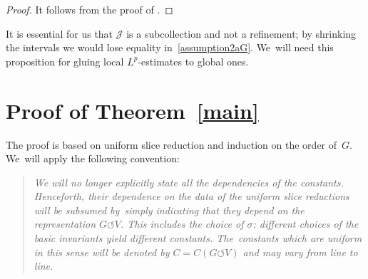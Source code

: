 \documentclass[11pt]{article}
\numberwithin{equation}{section}
\numberwithin{equation}{section}
\def\si{\sigma}
\def\cJ{\mathcal{J}}
\def\acts{\circlearrowleft}
\begin{document}
\begin{proof}
 It follows from the proof of \cite[Proposition 2]{ParusinskiRainer15}.
\end{proof}


\begin{Remark} \label{rem:cover}
 It is essential for us that $\cJ$ is a subcollection and not a refinement; by shrinking the intervals we would
 lose equality in~\eqref{assumption2aG}. We~will need this proposition for gluing local $L^p$-estimates to global ones.
\end{Remark}





\section{Proof of \texorpdfstring{Theorem~\ref{main}}{Theorem 1.1}} \label{proof}

The proof is based on uniform slice reduction and induction on the order of~$G$. We~will apply the following convention:
\begin{quote}
 \it We will no longer explicitly state all the dependencies of the constants. Henceforth, their dependence on the
 data of the uniform slice reductions will be subsumed by~simply indicating that they depend on the representation
 $G \acts V$. This includes the choice of $\si$: different choices of the basic invariants yield different constants.
 The~constants which are uniform in this sense will be denoted by $C = C(G \acts V)$ and may vary from line to line.
\end{quote}
\end{document}
